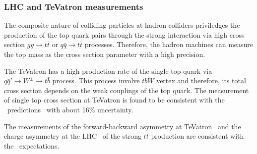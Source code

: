 \subsubsection{LHC and TeVatron measurements}
The composite nature of colliding particles at hadron colliders priviledges the production of the top quark pairs through the strong interaction via high cross section $gg\to t\bar{t}$ or $q\bar{q}\to t\bar{t}$ processes.
Therefore, the hadron machines can measure the top mass as the cross section parameter with a high precision. 

The TeVatron has a high production rate of the single top-quark via $q\bar{q}' \to W^\pm \to t\bar{b}$ process. %
This process involve $tbW$ vertex and therefore, its total cross section depends on the weak couplings of the top quark. 
The measurement of single top cross section at TeVatron is found to be consistent with the \sm\ predictions~\cite{bib:TeVstop} with about 16\% uncertainty.

The measurements of the forward-backward asymmetry at TeVatron~\cite{bib:TeVAfb} and the charge asymmetry at the LHC~\cite{Naranjo:2017etb} of the strong $t\bar{t}$ production are consistent with the \sm\ expectations. 

